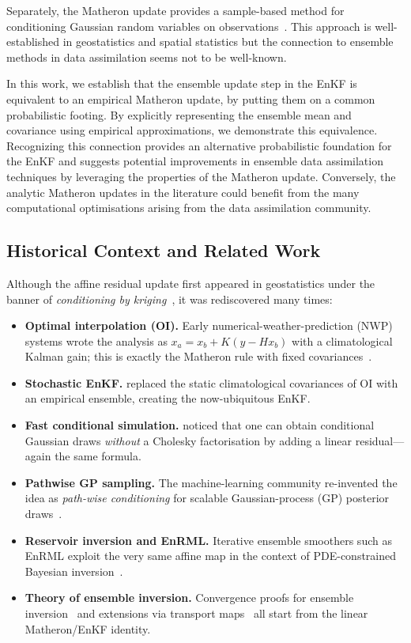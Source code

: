 \documentclass[wcp]{jmlr} %
\begin{document}
Separately, the Matheron update provides a sample-based method for conditioning Gaussian random variables on observations~\citep{Doucet2010Note,Wilson2020Efficiently,Wilson2021Pathwise}.
This approach is well-established in geostatistics and spatial statistics but the connection to ensemble methods in data assimilation seems not to be well-known.

In this work, we establish that the ensemble update step in the EnKF is equivalent to an empirical Matheron update, by putting them on a common probabilistic footing.
By explicitly representing the ensemble mean and covariance using empirical approximations, we demonstrate this equivalence.
Recognizing this connection provides an alternative probabilistic foundation for the EnKF and suggests potential improvements in ensemble data assimilation techniques by leveraging the properties of the Matheron update.
Conversely, the analytic Matheron updates in the literature could benefit from the many computational optimisations arising from the data assimilation community.

\subsection{Historical Context and Related Work}\label{sec:history}

Although the affine residual update first appeared in geostatistics under the banner of \emph{conditioning by kriging}~\citep{Chiles2018Kriging}, it was rediscovered many times:
\begin{itemize}
    \item \textbf{Optimal interpolation (OI).}  Early numerical-weather-prediction (NWP) systems wrote the analysis as
    $x_a = x_b + K(y - Hx_b)$ with a climatological Kalman gain; this is exactly the Matheron rule with fixed covariances~\citep{Hunt2007LETKF}.
    \item \textbf{Stochastic EnKF.}  \citet{Evensen2003EnKF} replaced the static climatological covariances of OI with an empirical ensemble, creating the now-ubiquitous EnKF.
    \item \textbf{Fast conditional simulation.}  \citet{Doucet2010Note} noticed that one can obtain conditional Gaussian draws \emph{without} a Cholesky factorisation by adding a linear residual—again the same formula.
    \item \textbf{Pathwise GP sampling.}  The machine-learning community re-invented the idea as \emph{path-wise conditioning} for scalable Gaussian-process (GP) posterior draws~\citep{Wilson2020Efficiently,Wilson2021Pathwise,Borovitskiy2020Matern}.
    \item \textbf{Reservoir inversion and EnRML.}  Iterative ensemble smoothers such as EnRML exploit the very same affine map in the context of PDE-constrained Bayesian inversion~\citep{Chen2012EnRML}.
    \item \textbf{Theory of ensemble inversion.}  Convergence proofs for ensemble inversion~\citep{Schillings2016EnKFInverse} and extensions via transport maps~\citep{Spantini2022Coupling} all start from the linear Matheron/EnKF identity.
\end{itemize}
\end{document}
